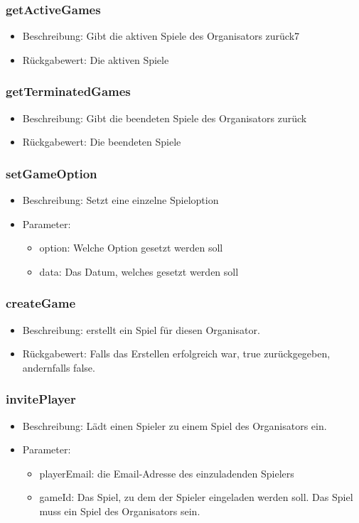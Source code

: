 \documentclass[a4paper]{scrreprt}
\begin{document}
	\subsubsection{getActiveGames}
	\begin{itemize}
	\item Beschreibung: Gibt die aktiven Spiele des Organisators zurück7
	\item Rückgabewert: Die aktiven Spiele
	\end{itemize}
	\subsubsection{getTerminatedGames}
	\begin{itemize}
		\item Beschreibung: Gibt die beendeten Spiele des Organisators zurück
		\item Rückgabewert: Die beendeten Spiele
		\end{itemize}
	\subsubsection{setGameOption}
	\begin{itemize}
		\item Beschreibung: Setzt eine einzelne Spieloption
		\item Parameter:
		\begin{itemize}
		\item option: Welche Option gesetzt werden soll
		\item data: Das Datum, welches gesetzt werden soll
		\end{itemize}
		\end{itemize}
	\subsubsection{createGame}
	\begin{itemize}
		\item Beschreibung: erstellt ein Spiel für diesen Organisator.
		\item Rückgabewert: Falls das Erstellen erfolgreich war, true zurückgegeben, andernfalls false.
	\end{itemize}
	\subsubsection{invitePlayer}
	\begin{itemize}
		\item Beschreibung: Lädt einen Spieler zu einem Spiel des Organisators ein.
		\item Parameter:
		\begin{itemize}
			\item playerEmail: die Email-Adresse des einzuladenden Spielers
			\item gameId: Das Spiel, zu dem der Spieler eingeladen werden soll. Das Spiel muss ein Spiel des Organisators sein.
		\end{itemize}
	\end{itemize}
\end{document}
